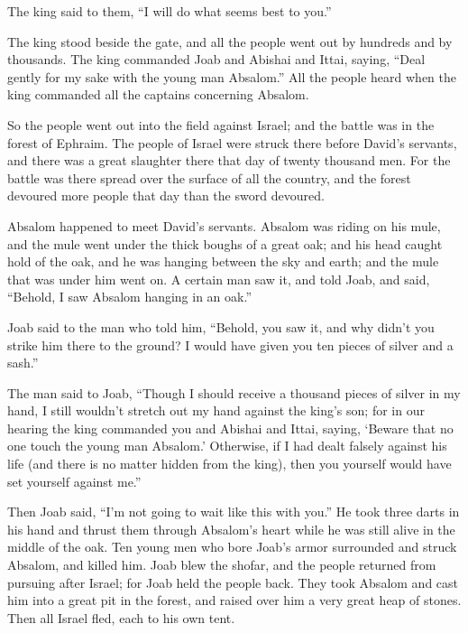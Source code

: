 \myverse{}The king said to them, “I will do what seems best to you.”

The king stood beside the gate, and all the people went out by hundreds and by thousands.
\myverse{}The king commanded Joab and Abishai and Ittai, saying, “Deal gently for my
sake with the young man Absalom.” All the people heard when the king commanded all the captains concerning
Absalom.

\myverse{}So the people went out into the field against Israel; and the
battle was in the forest of Ephraim.
\myverse{}The people of Israel were struck there before David’s servants, and there was
a great slaughter there that day of twenty thousand men.
\myverse{}For the battle was there spread over the surface of all the country, and the
forest devoured more people that day than the sword devoured.

\myverse{}Absalom happened to meet David’s servants. Absalom was riding
on his mule, and the mule went under the thick boughs of a great oak; and his head caught hold of the
oak, and he was hanging between the sky and earth; and the mule that was under him went on.
\myverse{}A certain man saw it, and told Joab, and said, “Behold, I saw Absalom hanging
in an oak.”

\myverse{}Joab said to the man who told him, “Behold, you saw it, and
why didn’t you strike him there to the ground? I would have given you ten pieces of silver and a sash.”

\myverse{}The man said to Joab, “Though I should receive a thousand pieces
of silver in my hand, I still wouldn’t stretch out my hand against the king’s son; for in our hearing
the king commanded you and Abishai and Ittai, saying, ‘Beware that no one touch the young man Absalom.’
\myverse{}Otherwise, if I had dealt falsely against his life (and there is no matter
hidden from the king), then you yourself would have set yourself against me.”

\myverse{}Then Joab said, “I’m not going to wait like this with you.”
He took three darts in his hand and thrust them through Absalom’s heart while he was still alive in the
middle of the oak.
\myverse{}Ten young men who bore Joab’s armor surrounded and struck Absalom, and killed
him.
\myverse{}Joab blew the shofar, and the people returned from pursuing after Israel;
for Joab held the people back.
\myverse{}They took Absalom and cast him into a great pit in the forest, and raised
over him a very great heap of stones. Then all Israel fled, each to his own tent.

